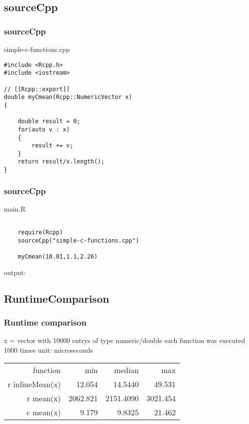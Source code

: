\documentclass[hyperef={
    colorlinks=true,
    linkcolor=blue,
    filecolor=black,
urlcolor=blue}
]{beamer}
\begin{document}
\subsection{sourceCpp}
\begin{frame}[fragile]
\frametitle{sourceCpp}
simple-c-functions.cpp
\begin{verbatim}
#include <Rcpp.h>
#include <iostream>

// [[Rcpp::export]]
double myCmean(Rcpp::NumericVector x)
{
   
    double result = 0;
    for(auto v : x)
    {
        result += v;
    }
    return result/x.length();
}
\end{verbatim}
\end{frame}

\begin{frame}[fragile]
\frametitle{sourceCpp}
main.R
\begin{verbatim}

    require(Rcpp)
    sourceCpp("simple-c-functions.cpp")

    myCmean(10.01,1.1,2.26)
\end{verbatim}
output: 

\end{frame}

\subsection{RuntimeComparison}
\begin{frame}
\frametitle{Runtime comparison}

x = vector with 10000 entrys of type numeric/double\newline
each function was executed 1000 times\newline
\newline
unit: microseconds\newline

\begin{tabular}{rrrr}
function & min & median & max \\
r inlineMean(x) & 12.054 & 14.5440 & 49.531 \\
r mean(x) & 2062.821 & 2151.4090 & 3021.454 \\
c mean(x) & 9.179 & 9.8325 & 21.462 \\
\end{tabular}
\end{frame}
\end{document}
